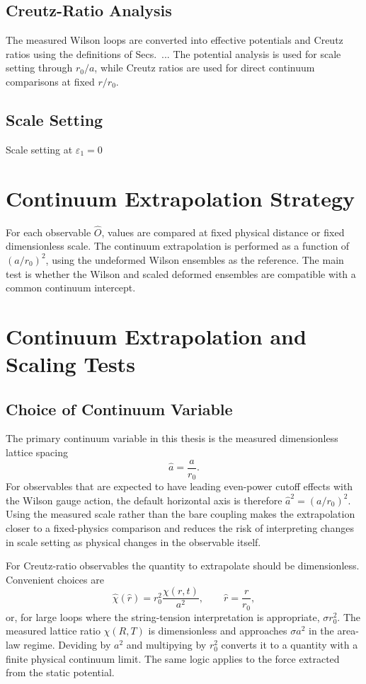 \documentclass[12pt,a4paper,oneside,numbers=noenddot]{scrreprt}
\newcommand{\eps}{\varepsilon}
\newcommand{\latspacing}{a}
\newcommand{\rzero}{r_0}
\newcommand{\stringtension}{\sigma}
\begin{document}
\subsection{Creutz-Ratio Analysis} 
The measured Wilson loops are converted into effective potentials and Creutz
ratios using the definitions of Secs.~... The potential analysis is used for
scale setting through \(r_0/a\), while Creutz ratios are used for direct
continuum comparisons at fixed \(r/r_0\).

\subsection{Scale Setting}
Scale setting at $\eps_1=0$

\section{Continuum Extrapolation Strategy}
For each observable \(\hat O\), values are compared at fixed physical distance
or fixed dimensionless scale. The continuum extrapolation is performed as a
function of \((a/r_0)^2\), using the undeformed Wilson ensembles as the
reference. The main test is whether the Wilson and scaled deformed ensembles
are compatible with a common continuum intercept.

\section{Continuum Extrapolation and Scaling Tests}
\subsection{Choice of Continuum Variable}
The primary continuum variable in this thesis is the measured dimensionless
lattice spacing
\begin{equation}
  \hat a
  =
  \frac{\latspacing}{\rzero}.
\end{equation}
For observables that are expected to have leading even-power cutoff effects
with the Wilson gauge action, the default horizontal axis is therefore
$\hat a^2=(\latspacing/\rzero)^2$. Using the measured scale rather than the bare
coupling makes the extrapolation closer to a fixed-physics comparison and
reduces the risk of interpreting changes in scale setting as physical changes
in the observable itself.

For Creutz-ratio observables the quantity to extrapolate should be
dimensionless. Convenient choices are
\begin{equation}
  \hat\chi(\hat r)
  =
  \rzero^2
  \frac{\chi(r,t)}{\latspacing^2},
  \qquad
  \hat r = \frac{r}{\rzero},
\end{equation}
or, for large loops where the string-tension interpretation is appropriate,
$\stringtension\rzero^2$. The measured lattice ratio $\chi(R,T)$ is
dimensionless and approaches $\stringtension\latspacing^2$ in the area-law
regime. Deviding by $\latspacing^2$ and multipying by $\rzero^2$ converts it
to a quantity with a finite physical continuum limit. The same logic applies to
the force extracted from the static potential.
\end{document}
